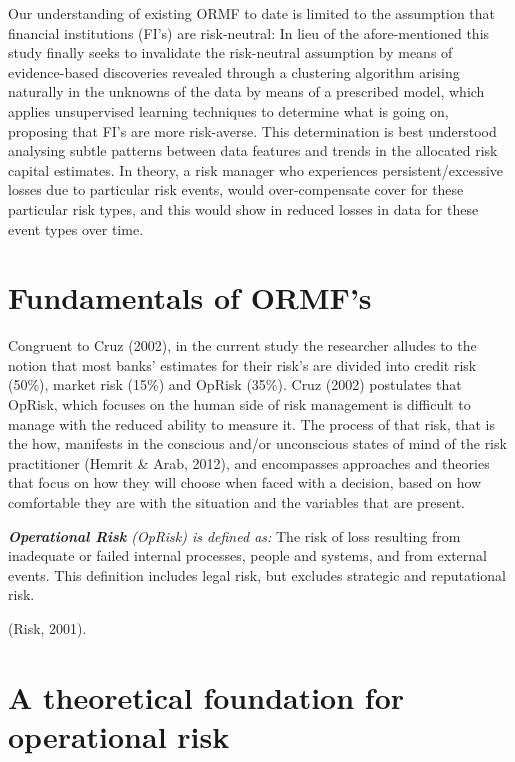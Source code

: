 \documentclass{DissertateUSU}
\begin{document}
Our understanding of existing ORMF to date is limited to the assumption
that financial institutions (FI's) are risk-neutral: In lieu of the
afore-mentioned this study finally seeks to invalidate the risk-neutral
assumption by means of evidence-based discoveries revealed through a
clustering algorithm arising naturally in the unknowns of the data by
means of a prescribed model, which applies unsupervised learning
techniques to determine what is going on, proposing that FI's are more
risk-averse. This determination is best understood analysing subtle
patterns between data features and trends in the allocated risk capital
estimates. In theory, a risk manager who experiences
persistent/excessive losses due to particular risk events, would
over-compensate cover for these particular risk types, and this would
show in reduced losses in data for these event types over time.

\section{Fundamentals of ORMF's}
\label{sec:Fundamentals of ORMF's}

Congruent to Cruz (2002), in the current study the researcher alludes to
the notion that most banks' estimates for their risk's are divided into
credit risk (50\%), market risk (15\%) and OpRisk (35\%). Cruz (2002)
postulates that OpRisk, which focuses on the human side of risk
management is difficult to manage with the reduced ability to measure
it. The process of that risk, that is the how, manifests in the
conscious and/or unconscious states of mind of the risk practitioner
(Hemrit \& Arab, 2012), and encompasses approaches and theories that
focus on how they will choose when faced with a decision, based on how
comfortable they are with the situation and the variables that are
present.

\begin{definition}
\emph{\textbf{Operational Risk} (OpRisk) is defined as:} The risk of loss resulting from inadequate or failed internal processes, people and systems, and from external events. This definition includes legal risk, but excludes strategic and reputational risk.\medskip
\end{definition}

(Risk, 2001).

\section{A theoretical foundation for operational risk}
\label{sec:A theoretical foundation for operational risk}
\end{document}
